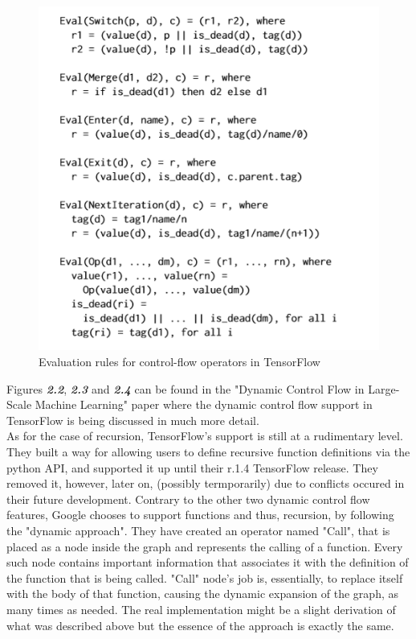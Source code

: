 \documentclass[ack,preface]{dithesis}
\begin{document}
\begin{figure}
\centering
\includegraphics[scale=0.85]{figures/opEval}
\caption{ Evaluation rules for control-flow operators in TensorFlow}
\end{figure}

Figures \textit{\textbf{2.2}}, \textit{\textbf{2.3}} and \textit{\textbf{2.4}} can be found in the "Dynamic Control Flow in Large-Scale Machine Learning" paper  \cite{Yu:2018} where the dynamic control flow support in TensorFlow is being discussed in much more detail. \\

As for the case of recursion, TensorFlow's support is still at a rudimentary level. They built a way for allowing users to define recursive function definitions via the python API,  and supported it up until their r.1.4 TensorFlow release. They removed it, however, later on, (possibly termporarily) due to conflicts occured in their future development. Contrary to the other two dynamic control flow features, Google chooses to support functions and thus, recursion, by following the "dynamic approach".  They have created an operator named "Call", that is placed as a node inside the graph and represents the calling of a function. Every such node contains important information that associates it with the definition  of the function that is being called.  "Call" node's job is, essentially,  to replace itself with the body of that function, causing the dynamic expansion of the graph, as many times as needed. The real implementation might be a slight derivation of what was described above but the essence of the approach is exactly the same.
\end{document}
